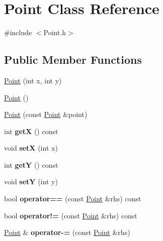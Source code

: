 \hypertarget{classPoint}{\section{Point Class Reference}
\label{classPoint}
}


{\ttfamily \#include $<$Point.\-h$>$}

\subsection*{Public Member Functions}
\begin{DoxyCompactItemize}
\item 
\hyperlink{classPoint_a001c4958c310b248f5c26037aea38a9c}{Point} (int x, int y)
\item 
\hyperlink{classPoint_ad92f2337b839a94ce97dcdb439b4325a}{Point} ()
\item 
\hyperlink{classPoint_a53534941e7bcb3c6d3af84d58a542899}{Point} (const \hyperlink{classPoint}{Point} \&point)
\item 
\hypertarget{classPoint_abe622fffc8785b0c2e06cdac681b9837}{int {\bfseries get\-X} () const }\label{classPoint_abe622fffc8785b0c2e06cdac681b9837}

\item 
\hypertarget{classPoint_acdc86ab607b2ae8415152883e2629015}{void {\bfseries set\-X} (int x)}\label{classPoint_acdc86ab607b2ae8415152883e2629015}

\item 
\hypertarget{classPoint_a10f31e48e2dbc22e3660ca769b8d5d65}{int {\bfseries get\-Y} () const }\label{classPoint_a10f31e48e2dbc22e3660ca769b8d5d65}

\item 
\hypertarget{classPoint_afccad787a359f062efc1af5e935a99ba}{void {\bfseries set\-Y} (int y)}\label{classPoint_afccad787a359f062efc1af5e935a99ba}

\item 
\hypertarget{classPoint_a381c5b2ac13d8a3966f5225f94fff6fa}{bool {\bfseries operator==} (const \hyperlink{classPoint}{Point} \&rhs) const }\label{classPoint_a381c5b2ac13d8a3966f5225f94fff6fa}

\item 
\hypertarget{classPoint_aa85f211e55420f0f622a77920581732a}{bool {\bfseries operator!=} (const \hyperlink{classPoint}{Point} \&rhs) const }\label{classPoint_aa85f211e55420f0f622a77920581732a}

\item 
\hypertarget{classPoint_aaea5d476866984dc521991e606040b52}{\hyperlink{classPoint}{Point} \& {\bfseries operator-\/=} (const \hyperlink{classPoint}{Point} \&rhs)}\label{classPoint_aaea5d476866984dc521991e606040b52}


\end{DoxyCompactItemize}
